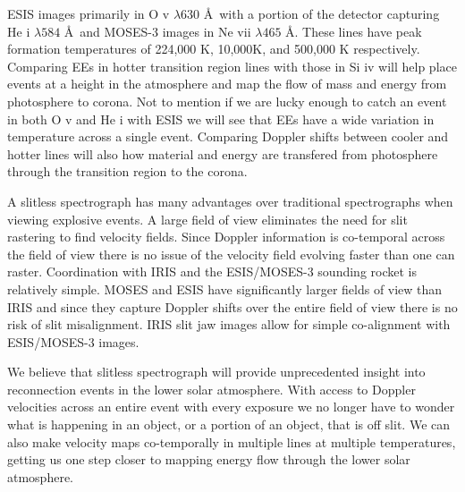 \documentclass[]{aastex6}
\begin{document}
	ESIS images primarily in O {\sc v} $\lambda 630$ \AA \ with a portion of the detector capturing He {\sc i} $\lambda 584$ \AA \ and MOSES-3 images in Ne {\sc vii} $\lambda 465$ \AA.  These lines have peak formation temperatures of 224,000 K, 10,000K, and 500,000 K respectively. Comparing EEs in hotter transition region lines with those in Si {\sc iv} will help place events at a height in the atmosphere and map the flow of mass and energy from photosphere to corona.  Not to mention if we are lucky enough to catch an event in both O {\sc v} and He {\sc i} with ESIS we will see that EEs have a wide variation in temperature across a single event.  Comparing Doppler shifts between cooler and hotter lines will also how material and energy are transfered from photosphere through the transition region to the corona.
	
	A slitless spectrograph has many advantages over traditional spectrographs when viewing explosive events.  A large field of view eliminates the need for slit rastering to find velocity fields.  Since Doppler information is co-temporal across the field of view there is no issue of the velocity field evolving faster than one can raster. Coordination with IRIS and the ESIS/MOSES-3 sounding rocket is relatively simple. MOSES and ESIS have significantly larger fields of view than IRIS and since they capture Doppler shifts over the entire field of view there is no risk of slit misalignment.  IRIS slit jaw images allow for simple co-alignment with ESIS/MOSES-3 images.
	
	We believe that slitless spectrograph will provide unprecedented insight into reconnection events in the lower solar atmosphere. With access to Doppler velocities across an entire event with every exposure we no longer have to wonder what is happening in an object, or a portion of an object, that is off slit.  We can also make velocity maps co-temporally in multiple lines at multiple temperatures, getting us one step closer to mapping energy flow through the lower solar atmosphere.
\end{document}
